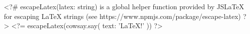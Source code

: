 \documentclass{article}
\begin{document}
<?# escapeLatex(latex: string) is a global helper function provided by JSLaTeX for escaping LaTeX strings (see https://www.npmjs.com/package/escape-latex) ?>
<?= escapeLatex(cowsay.say({ text: 'LaTeX!' })) ?>
\end{document}
